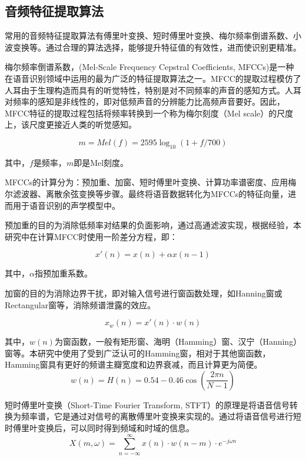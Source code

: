 \documentclass[lang=cn,cite=super]{elegantpaper}
\begin{document}
\subsection{音频特征提取算法}
常用的音频特征提取算法有傅里叶变换、短时傅里叶变换、梅尔频率倒谱系数、小波变换等。通过合理的算法选择，能够提升特征值的有效性，进而使识别更精准。

梅尔频率倒谱系数，(Mel-Scale Frequency Cepstral Coefficients, MFCCs)是一种在语音识别领域中运用的最为广泛的特征提取算法之一。MFCC的提取过程模仿了人耳由于生理构造而具有的听觉特性，特别是对不同频率的声音的感知方式。人耳对频率的感知是非线性的，即对低频声音的分辨能力比高频声音要好。因此，MFCC特征的提取过程包括将频率转换到一个称为梅尔刻度（Mel scale）的尺度上，该尺度更接近人类的听觉感知。

\begin{equation}
    m = Mel(f) = 2595 \log_{10}(1+f/700)
\end{equation}

其中，$f$是频率，$m$即是Mel刻度。

MFCCs的计算分为：预加重、加窗、短时傅里叶变换、计算功率谱密度、应用梅尔滤波器、离散余弦变换等步骤。最终将语音数据转化为MFCCs的特征向量，进而用于语音识别的声学模型中。

预加重的目的为消除低频率对结果的负面影响，通过高通滤波实现，根据经验，本研究中在计算MFCC时使用一阶差分方程，即：

\begin{equation}
    x'(n) = x(n) + \alpha x(n-1) 
\end{equation}

其中，$\alpha$指预加重系数。

加窗的目的为消除边界干扰，即对输入信号进行窗函数处理，如Hanning窗或Rectangular窗等，消除频谱泄露的效应。

\begin{equation}
    x_w(n) = x'(n) \cdot w(n)
\end{equation}

其中，$w(n)$为窗函数，一般有矩形窗、海明（Hamming）窗、汉宁（Hanning）窗等。本研究中使用了受到广泛认可的Hamming窗，相对于其他窗函数，Hamming窗具有更好的频谱主瓣宽度和边界衰减，而且计算更为简便。
\begin{equation}
    w(n) = H(n) = 0.54 - 0.46 \cos \left( \frac{2\pi n}{N-1} \right)
\end{equation}

短时傅里叶变换（Short-Time Fourier Transform, STFT）的原理是将语音信号转换为频率谱，它是通过对信号的离散傅里叶变换来实现的。通过将语音信号进行短时傅里叶变换后，可以同时得到频域和时域的信息。
\begin{equation}
    X(m, \omega) = \sum_{n=-\infty}^{\infty} x(n) \cdot w(n-m) \cdot e^{-j\omega n}
\end{equation}
\end{document}

